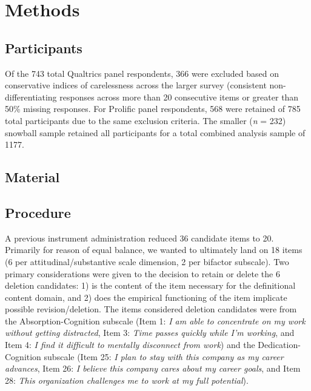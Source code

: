 \documentclass[
  man]{apa6}
\begin{document}
\hypertarget{methods}{%
\section{Methods}\label{methods}}

\hypertarget{participants}{%
\subsection{Participants}\label{participants}}

Of the 743 total Qualtrics panel respondents, 366 were excluded based on conservative indices of carelessness across the larger survey (consistent non-differentiating responses across more than 20 consecutive items or greater than 50\% missing responses. For Prolific panel respondents, 568 were retained of 785 total participants due to the same exclusion criteria. The smaller (\emph{n} = 232) snowball sample retained all participants for a total combined analysis sample of 1177.

\hypertarget{material}{%
\subsection{Material}\label{material}}

\hypertarget{procedure}{%
\subsection{Procedure}\label{procedure}}

A previous instrument administration reduced 36 candidate items to 20. Primarily for reason of equal balance, we wanted to ultimately land on 18 items (6 per attitudinal/substantive scale dimension, 2 per bifactor subscale). Two primary considerations were given to the decision to retain or delete the 6 deletion candidates: 1) is the content of the item necessary for the definitional content domain, and 2) does the empirical functioning of the item implicate possible revision/deletion. The items considered deletion candidates were from the Absorption-Cognition subscale (Item 1: \emph{I am able to concentrate on my work without getting distracted}, Item 3: \emph{Time passes quickly while I'm working}, and Item 4: \emph{I find it difficult to mentally disconnect from work}) and the Dedication-Cognition subscale (Item 25: \emph{I plan to stay with this company as my career advances}, Item 26: \emph{I believe this company cares about my career goals}, and Item 28: \emph{This organization challenges me to work at my full potential}).
\end{document}
